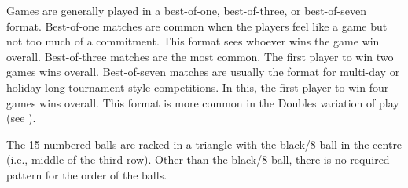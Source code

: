 


 Games are generally played in a best-of-one, best-of-three, or best-of-seven format.%
\subruleitem Best-of-one matches are common when the players feel like a game but not too much of a commitment. This format sees whoever wins the game win overall.%
\subruleitem Best-of-three matches are the most common. The first player to win two games wins overall.%
\subruleitem Best-of-seven matches are usually the format for multi-day or holiday-long tournament-style competitions. In this, the first player to win four games wins overall. This format is more common in the Doubles variation of play (see ).%


 {}%
\DetermineWhoRacks%
%
\subruleitem The 15 numbered balls are racked in a triangle with the black/8-ball in the centre (i.e., middle of the third row). Other than the black/8-ball, there is no required pattern for the order of the balls.%
\subruleitem \TightlyPacked%
\subruleitem {}%
\subruleitem {}%
\subruleitem {}%


